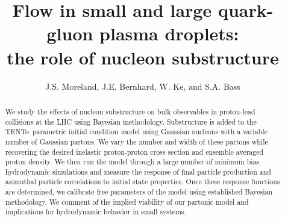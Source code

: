 \documentclass[3p,times,procedia]{elsarticle}
\newcommand{\trento}{T\raisebox{-0.3ex}{R}ENTo}
\begin{document}
\begin{frontmatter}




\title{Flow in small and large quark-gluon plasma droplets:\\the role of nucleon substructure}

\author{J.S. Moreland, J.E. Bernhard, W. Ke, and S.A. Bass}
\address{Department of Physics, Duke University, Durham, NC 27708-0305}

\begin{abstract}
We study the effects of nucleon substructure on bulk observables in proton-lead collisions at the LHC using Bayesian methodology. Substructure is added to the \trento\ parametric initial condition model using Gaussian nucleons with a variable number of Gaussian partons. We vary the number and width of these partons while recovering the desired inelastic proton-proton cross section and ensemble averaged proton density. We then run the model through a large number of minimum bias hydrodynamic simulations and measure the response of final particle production and azimuthal particle correlations to initial state properties. Once these response functions are determined, we calibrate free parameters of the model using established Bayesian methodology. We comment of the implied viability of our partonic model and implications for hydrodynamic behavior in small systems.
\end{abstract}


\end{frontmatter}
\end{document}
